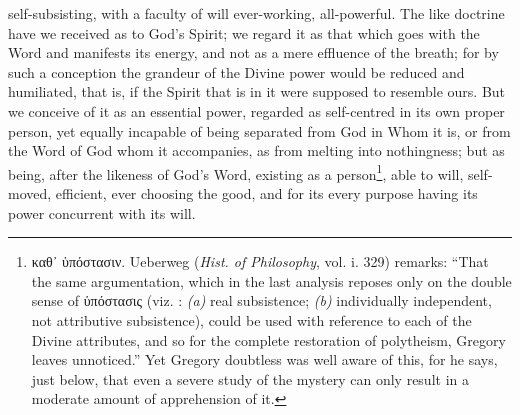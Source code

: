 self-subsisting, with a faculty of will ever-working, all-powerful. The like doctrine have we received as to God’s Spirit; we regard it as that which goes with the Word and manifests its energy, and not as a mere effluence of the breath; for by such a conception the grandeur of the Divine power would be reduced and humiliated, that is, if the Spirit that is in it were supposed to resemble ours. But we conceive of it as an essential power, regarded as self-centred in its own proper person, yet equally incapable of being separated from God in Whom it is, or from the Word of God whom it accompanies, as from melting into nothingness; but as being, after the likeness of God’s Word, existing as a person\footnote{\textgreek{καθ᾽ ὑπόστασιν}. Ueberweg (\emph{Hist. of Philosophy}, vol. i. 329) remarks: “That the same argumentation, which in the last analysis reposes only on the double sense of \textgreek{ὑπόστασις} (viz. : \emph{(a)} real subsistence; \emph{(b)} individually independent, not attributive subsistence), could be used with reference to each of the Divine attributes, and so for the complete restoration of polytheism, Gregory leaves unnoticed.” Yet Gregory doubtless was well aware of this, for he says, just below, that even a severe study of the mystery can only result in a moderate amount of apprehension of it.}, able to will, self-moved, efficient, ever choosing the good, and for its every purpose having its power concurrent with its will.


